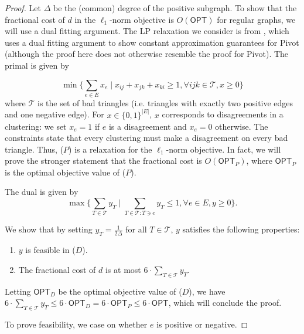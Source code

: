 \begin{proof}
    Let $\Delta$ be the (common) degree of the positive subgraph. To show that the fractional cost of $d$ in the $\ell_1$-norm objective is $O(\textsf{OPT})$ for regular graphs, we will use a dual fitting argument. The LP relaxation we consider is from \cite{ACN-pivot}, which uses a dual fitting argument to show constant approximation guarantees for Pivot (although the proof here does not otherwise resemble the proof for Pivot). The primal is given by 

\begin{equation} \label{eq: lp_pivot} \tag{$P$}
 \min\Big\{\sum_{e \in E} x_e \mid x_{ij}+x_{jk}+x_{ki} \geq 1, \forall ijk \in \mathcal{T}, x \geq 0\Big\}
\end{equation}
where $\mathcal{T}$ is the set of bad triangles (i.e. triangles with exactly two positive edges and one negative edge). For $x \in \{0,1\}^{|E|}$, $x$ corresponds to disagreements in a clustering: we set $x_e = 1$ if $e$ is a disagreement and $x_e = 0$ otherwise. The constraints state that every clustering must make a disagreement on every bad triangle. Thus, ($P$) is a relaxation for the $\ell_1$-norm objective. In fact, we will prove the stronger statement that the fractional cost is $O(\textsf{OPT}_{P})$, where $\textsf{OPT}_{P}$ is the optimal objective value of ($P$). 

The dual is given by 
\begin{equation} \label{eq: dual_pivot} \tag{$D$}
\max\Big\{\sum_{T \in \mathcal{T}}y_T \mid \sum_{T \in \mathcal{T}: T \ni e} y_T \leq 1, \forall e \in E, y \geq 0 \Big\}.
\end{equation}

We show that by setting $y_T = \frac{1}{2\Delta}$ for all $T \in \mathcal{T}$, $y$ satisfies the following properties:
\begin{enumerate}
    \item $y$ is feasible in ($D$).
    \item The fractional cost of $d$ is at most $6 \cdot \sum_{T \in \mathcal{T}} y_T$.
\end{enumerate}

Letting $\textsf{OPT}_D$ be the optimal objective value of ($D$), we have $6 \cdot \sum_{T \in \mathcal{T}} y_T \leq 6 \cdot \textsf{OPT}_D = 6 \cdot \textsf{OPT}_{P} \leq 6 \cdot \textsf{OPT}$, which will conclude the proof.

To prove feasibility, we case on whether $e$ is positive or negative. 


\end{proof}
